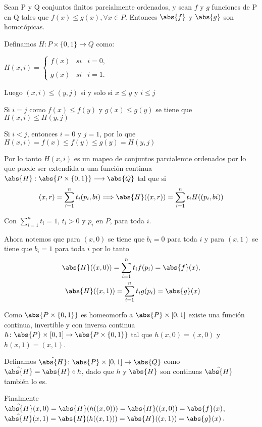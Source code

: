 \begin{Teo}
Sean P y Q conjuntos finitos parcialmente ordenados, y sean $f$ y $g$ funciones de P en Q tales que $f(x)\leq g(x), \forall x\in P$. Entonces $\abs{f}$ y $\abs{g}$ son homotópicas.
\end{Teo}
\begin{Dem}

Definamos $H\colon P\times \{ 0,1\} \rightarrow Q$ como:

$H(x,i)= \left\{ \begin{array}{lcc}
              f(x)&   si &i=0,  \\
             \\ g(x) &  si& i=1. 
             \end{array}
    \right. $

Luego $(x,i) \leq (y,j)$ si y solo si $x\leq y$ y $i\leq j$

Si $i=j$ como $f(x)\leq f(y)$ y $g(x)\leq g(y)$ se tiene que $H(x,i)\leq H(y,j)$

Si $i<j$, entonces $i = 0$ y $j = 1$, por lo que
$H(x,i) = f(x)\leq f(y)\leq g(y) = H(y,j)$

Por lo tanto $H(x,i)$ es un mapeo de conjuntos parcialemte ordenados por lo que puede ser extendida a una función continua $\abs{H}:\abs{P\times \{ 0,1\}} \longrightarrow \abs{Q}$ tal que si
\[
(x,r) =\sum_{i=1}^{n}t_{i}(p_{i},b{i}) \Longrightarrow \abs{H}((x,r))= \sum_{i=1}^{n}t_{i}H((p_{i},b{i}))
\]

Con $\sum_{i=1}^{n}t_{i}=1$, $t_{i}>0$ y $p_{i}$ en $P$, para toda $i$.

Ahora notemos que para $(x,0)$ se tiene que  $b_{i}=0$ para toda $i$ y para $(x,1)$ se tiene que $ b_{i} = 1$ para toda $i$ por lo tanto
\begin{eqnarray}
\abs{H}((x,0)) =\sum_{i=1}^{n}t_{i}f(p_{i}) = \abs{f}(x),\\
\abs{H}((x,1)) =\sum_{i=1}^{n}t_{i}g(p_{i}) = \abs{g}(x)
\end{eqnarray}

Como $\abs{P\times\{0,1\}}$ es homeomorfo a $\abs{P}\times[0,1]$ existe una función continua, invertible y con inversa continua $h\colon\abs{P}\times[0,1]\rightarrow \abs{P\times\{0,1\}}$ tal que $h(x,0) = (x,0)$ y $h(x,1) = (x,1)$.

Definamos $\hat{\abs{H}}\colon\abs{P}\times[0,1]\to \abs{Q}$ como $\hat{\abs{H}} =  \abs{H} \circ h$, dado que $h$ y $\abs{H}$ son continuas $\hat{\abs{H}}$ también lo es.

Finalmente 
$\hat{\abs{H}}(x,0)= \abs{H}(h((x,0)))=\abs{H}((x,0)) = \abs{f}(x)$,
$\hat{\abs{H}}(x,1)= \abs{H}(h((x,1)))=\abs{H}((x,1)) = \abs{g}(x)$.
\end{Dem}

